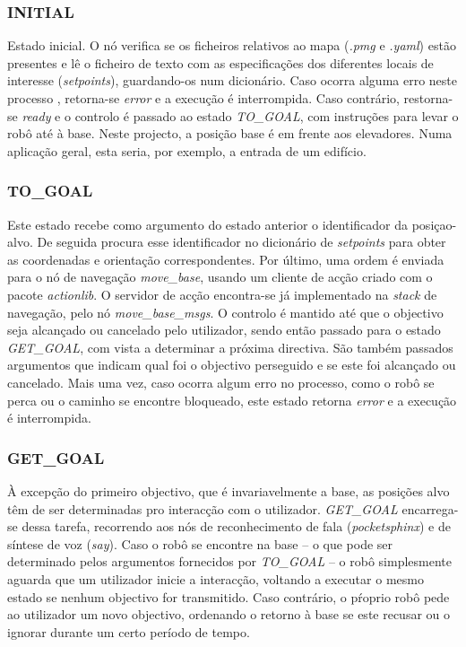 \documentclass[journal]{IEEEtran}
\begin{document}
\subsubsection{INITIAL} Estado inicial. O nó verifica se os ficheiros relativos ao mapa (\textit{.pmg} e \textit{.yaml}) estão presentes e lê o ficheiro de texto com as especificações dos diferentes locais de interesse (\textit{setpoints}), guardando-os num dicionário. Caso ocorra alguma erro neste processo , retorna-se \textit{error} e a execução é interrompida. Caso contrário, restorna-se \textit{ready} e o controlo é passado ao estado \textit{TO\_GOAL}, com instruções para levar o robô até à base. Neste projecto, a posição base é em frente aos elevadores. Numa aplicação geral, esta seria, por exemplo, a entrada de um edifício.

\subsubsection{TO\_GOAL} Este estado recebe como argumento do estado anterior o identificador da posiçao-alvo. De seguida procura esse identificador no dicionário de \textit{setpoints} para obter as coordenadas e orientação correspondentes. Por último, uma ordem é enviada para o nó de navegação \textit{move\_base}, usando um cliente de acção criado com o pacote \textit{actionlib}. O servidor de acção encontra-se já implementado na \textit{stack} de navegação, pelo nó \textit{move\_base\_msgs}. O controlo é mantido até que o objectivo seja alcançado ou cancelado pelo utilizador, sendo então passado para o estado \textit{GET\_GOAL}, com vista a determinar a próxima directiva. São também passados argumentos que indicam qual foi o objectivo perseguido e se este foi alcançado ou cancelado. Mais uma vez, caso ocorra algum erro no processo, como o robô se perca ou o caminho se encontre bloqueado, este estado retorna \textit{error} e a execução é interrompida.

\subsubsection{GET\_GOAL} À excepção do primeiro objectivo, que é invariavelmente a base, as posições alvo têm de ser determinadas pro interacção com o utilizador. \textit{GET\_GOAL} encarrega-se dessa tarefa, recorrendo aos nós de reconhecimento de fala (\textit{pocketsphinx}) e de síntese de voz (\textit{say}). Caso o robô se encontre na base -- o que pode ser determinado pelos argumentos fornecidos por \textit{TO\_GOAL} -- o robô simplesmente aguarda que um utilizador inicie a interacção, voltando a executar o mesmo estado se nenhum objectivo for transmitido. Caso contrário, o pŕoprio robô pede ao utilizador um novo objectivo, ordenando o retorno à base se este recusar ou o ignorar durante um certo período de tempo.
\end{document}

